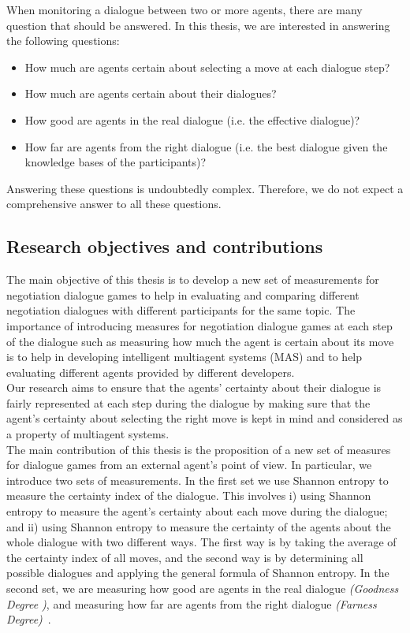 \indent When monitoring a dialogue between two or more agents, there are many question that should be answered. In this thesis, we are interested in answering the following questions:

\begin{itemize}
\item How much are agents certain about selecting a move at each dialogue step?
\item How much are agents certain about their dialogues?
\item How good are agents in the real dialogue (i.e. the effective dialogue)?
\item How far are agents from the right dialogue (i.e. the best dialogue given the knowledge bases of the participants)?
\end{itemize}
Answering these questions is undoubtedly complex. Therefore, we do not expect a comprehensive answer to all these questions.



\subsection{Research objectives and contributions}\label{sec:contribution}

The main objective of this thesis is to develop a new set of measurements for negotiation dialogue games to help in evaluating and
comparing different negotiation dialogues with different participants for the same topic. The importance of introducing measures for
negotiation dialogue games at each step of the dialogue such as measuring how much the agent is certain about its move is to help in developing intelligent multiagent systems (MAS) and to help evaluating different agents provided by different developers.\\
\indent Our research aims to ensure that the agents' certainty about their dialogue is fairly represented at each step during
the dialogue by making sure that the agent's certainty about selecting the right move is kept in mind and considered as a property
of multiagent systems.\\
\indent The main contribution of this thesis is the proposition of a new set of measures for dialogue games from an external agent's point of view.
In particular, we introduce two sets of measurements. In the first set  we use Shannon entropy to measure the certainty index of the dialogue.
This involves i) using Shannon entropy to measure the agent's certainty about each move during the dialogue; and ii) using
Shannon entropy to measure the certainty of the agents about the whole dialogue with two different ways. The first way is
by taking the average of the certainty index of all moves, and the second way is by determining all possible dialogues and
applying the general formula of Shannon entropy. In the second set, we are measuring how good are agents in the real dialogue
\emph{(Goodness Degree )}, and measuring how far are agents from the right dialogue \emph{(Farness Degree)}~\cite{Marey09}.



